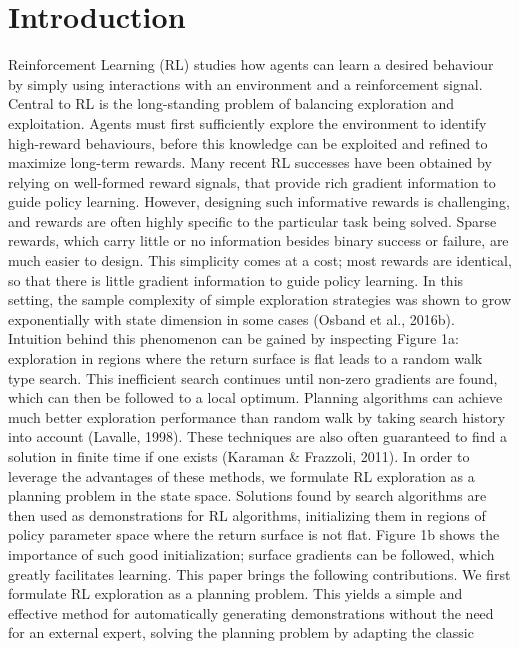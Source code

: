 \documentclass{article}
\newcounter{n}
\begin{document}
\section{Introduction}
Reinforcement Learning (RL) studies how agents can learn a desired behaviour by simply using interactions with an environment and a reinforcement signal. Central to RL is the long-standing problem
of balancing exploration and exploitation. Agents must first sufficiently explore the environment to
identify high-reward behaviours, before this knowledge can be exploited and refined to maximize
long-term rewards. Many recent RL successes have been obtained by relying on well-formed reward
signals, that provide rich gradient information to guide policy learning. However, designing such
informative rewards is challenging, and rewards are often highly specific to the particular task being
solved. Sparse rewards, which carry little or no information besides binary success or failure, are
much easier to design. This simplicity comes at a cost; most rewards are identical, so that there is
little gradient information to guide policy learning. In this setting, the sample complexity of simple
exploration strategies was shown to grow exponentially with state dimension in some cases (Osband
et al., 2016b). Intuition behind this phenomenon can be gained by inspecting Figure 1a: exploration
in regions where the return surface is flat leads to a random walk type search. This inefficient search
continues until non-zero gradients are found, which can then be followed to a local optimum.
Planning algorithms can achieve much better exploration performance than random walk by taking
search history into account (Lavalle, 1998). These techniques are also often guaranteed to find a
solution in finite time if one exists (Karaman & Frazzoli, 2011). In order to leverage the advantages
of these methods, we formulate RL exploration as a planning problem in the state space. Solutions
found by search algorithms are then used as demonstrations for RL algorithms, initializing them in
regions of policy parameter space where the return surface is not flat. Figure 1b shows the importance
of such good initialization; surface gradients can be followed, which greatly facilitates learning.
This paper brings the following contributions. We first formulate RL exploration as a planning
problem. This yields a simple and effective method for automatically generating demonstrations
without the need for an external expert, solving the planning problem by adapting the classic
\end{document}
